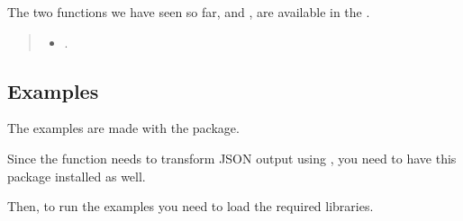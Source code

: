 \documentclass[a4paper,12pt,english]{sphinxhowto}
\begin{document}

The two functions we have seen so far,  and ,
are available in the {\hyperref[\detokenize{sdam:sdam-pkg}]{}}.

\begin{quote}



\begin{itemize}
\item {} 
{\hyperref[\detokenize{sdam:sdam-inst}]{}}.

\end{itemize}


\end{quote}



\subsection{Examples}
\label{\detokenize{Epigraphic:examples}}
The examples are made with the   package.

Since  the  function needs to transform JSON output using ,
you need to have this package installed as well.


Then, to run the examples you need to load the required libraries.

\begin{sphinxVerbatim}[commandchars=\\\{\},formatcom=\footnotesize]
 
   
\end{sphinxVerbatim}
\end{document}
